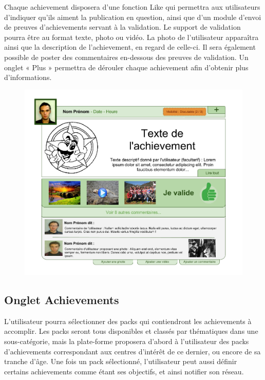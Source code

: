 \documentclass{life-fr}
\begin{document}
Chaque achievement disposera d'une fonction Like qui permettra aux utilisateurs d'indiquer qu'ils aiment la publication en question, ainsi que d'un module d'envoi de preuves d'achievements servant à la validation. Le support de validation pourra être au format texte, photo ou vidéo. La photo de l'utilisateur apparaîtra ainsi que la description de l'achievement, en regard de celle-ci. Il sera également possible de poster des commentaires en-dessous des preuves de validation. Un onglet « Plus » permettra de dérouler chaque achievement afin d'obtenir plus d'informations.\\

\begin{figure}[H]
  \begin{center}
    \includegraphics[width=15cm]{img/achievement.png}
  \end{center}
\end{figure}

\subsection{Onglet Achievements}

L'utilisateur pourra sélectionner des packs qui contiendront les achievements à accomplir. Les packs seront tous disponibles et classés par thématiques dans une sous-catégorie, mais la plate-forme proposera d'abord à l'utilisateur des packs d'achievements correspondant aux centres d'intérêt de ce dernier, ou encore de sa tranche d'âge. Une fois un pack sélectionné, l'utilisateur peut aussi définir certains achievements comme étant ses objectifs, et ainsi notifier son réseau.
\end{document}
